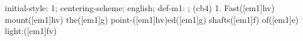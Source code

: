initial-style: 1;
centering-scheme: english;
def-m1: \grealign;
(cb4) 1. Fast([em1]hv) mount([em1]hv) the([em1]g) point-([em1]hv)ed([em1]g) shafts([em1]f) of([em1]e) light:([em1]fv)
